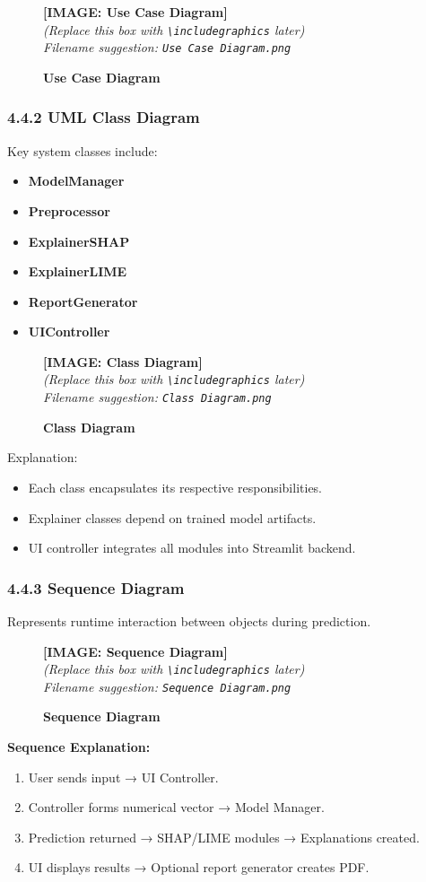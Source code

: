 \documentclass[12pt, a4paper]{article}
\newcommand{\imageplaceholder}[2]{
  \begin{figure}[H]
    \centering
    \begin{tcolorbox}[colback=white, colframe=black, width=0.8\textwidth, arc=0mm, boxrule=1pt]
      \centering
      \vspace{#2}
      \textbf{\Large [IMAGE: #1]}\\
      \vspace{0.5cm}
      \textit{(Replace this box with \texttt{\textbackslash includegraphics} later)}\\
      \textit{Filename suggestion: \texttt{#1.png}}
      \vspace{#2}
    \end{tcolorbox}
    \caption{\textbf{#1}}
    \label{fig:#1}
  \end{figure}
}
\begin{document}
\imageplaceholder{Use Case Diagram}{6cm}

\subsubsection{\textbf{4.4.2 UML Class Diagram}}

Key system classes include:

\begin{itemize}
    \item \textbf{ModelManager}
    \item \textbf{Preprocessor}
    \item \textbf{ExplainerSHAP}
    \item \textbf{ExplainerLIME}
    \item \textbf{ReportGenerator}
    \item \textbf{UIController}
\end{itemize}

\imageplaceholder{Class Diagram}{6cm}

\noindent
Explanation:

\begin{itemize}
    \item Each class encapsulates its respective responsibilities.
    \item Explainer classes depend on trained model artifacts.
    \item UI controller integrates all modules into Streamlit backend.
\end{itemize}

\subsubsection{\textbf{4.4.3 Sequence Diagram}}

Represents runtime interaction between objects during prediction.

\imageplaceholder{Sequence Diagram}{6cm}

\noindent
\textbf{Sequence Explanation:}

\begin{enumerate}
    \item User sends input → UI Controller.
    \item Controller forms numerical vector → Model Manager.
    \item Prediction returned → SHAP/LIME modules → Explanations created.
    \item UI displays results → Optional report generator creates PDF.
\end{enumerate}
\end{document}
